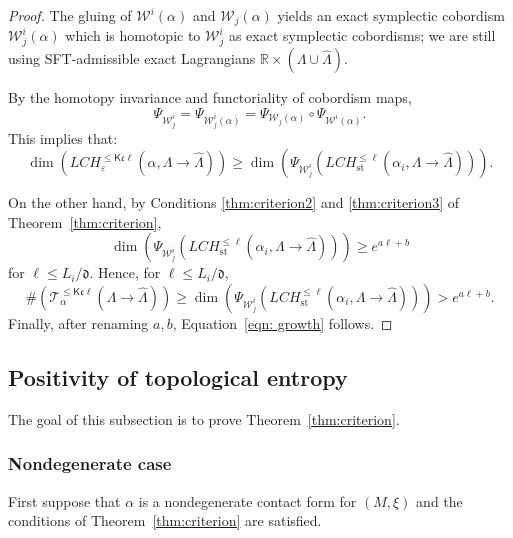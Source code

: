 \documentclass[10pt]{amsart}
\let\mathcal\mathscr
\let\epsilon\varepsilon
\let\ra\rightarrow
\newcommand{\st}{\mathrm{st}}
\theoremstyle{plain}
\theoremstyle{definition}
\numberwithin{equation}{subsection}
\begin{document}
\begin{proof}
The gluing of $\mathcal{W}^i(\alpha)$ and $\mathcal{W}_j(\alpha)$ yields an exact symplectic cobordism $\mathcal{W}^i_j(\alpha)$ which is homotopic to $\mathcal{W}^i_j$ as exact symplectic cobordisms; we are still using SFT-admissible exact Lagrangians $\mathbb{R}\times (\Lambda\cup \widehat{\Lambda})$.

By the homotopy invariance and functoriality of cobordism maps,
\begin{equation}
\Psi_{\mathcal{W}^i_j}=\Psi_{\mathcal{W}^i_j(\alpha)} = \Psi_{\mathcal{W}_j(\alpha) } \circ \Psi_{\mathcal{W}^i(\alpha)}.
\end{equation}
This implies that:
\begin{equation}
\dim (LCH^{\leq \mathsf{K} {\mathfrak c}\ell}_{\epsilon}(\alpha,\Lambda\ra \widehat{\Lambda})) \geq \dim(\Psi_{\mathcal{W}^i_j}(LCH^{\leq \ell}_{\st}(\alpha_i,\Lambda\ra \widehat{\Lambda}))).
\end{equation}

On the other hand, by Conditions \eqref{thm:criterion2} and \eqref{thm:criterion3} of Theorem~\ref{thm:criterion},
\begin{equation}%
\dim(\Psi_{\mathcal{W}^i_j}(LCH^{\leq \ell}_{\st}(\alpha_i,\Lambda\ra \widehat{\Lambda}))) \geq e^{a \ell + b}
\end{equation}
for $\ell\leq L_i/{\mathfrak d}$. Hence, for $\ell\leq L_i/{\mathfrak d}$,
\begin{equation}
\#(\mathcal{T}^{\leq \mathsf{K}{\mathfrak c}\ell}_\alpha(\Lambda\ra \widehat{\Lambda})) \geq \dim(\Psi_{\mathcal{W}^i_j}(LCH^{\leq \ell}_{\st}(\alpha_i,\Lambda\ra \widehat{\Lambda}))) > e^{a\ell + b}.
\end{equation}
Finally, after renaming $a,b$, Equation~\eqref{eqn: growth} follows.
\end{proof}

\subsection{Positivity of topological entropy}

The goal of this subsection is to prove Theorem~\ref{thm:criterion}.

\subsubsection*{Nondegenerate case} First suppose that $\alpha$ is a nondegenerate contact form for $(M,\xi)$ and the conditions of Theorem~\ref{thm:criterion} are satisfied.
\end{document}
